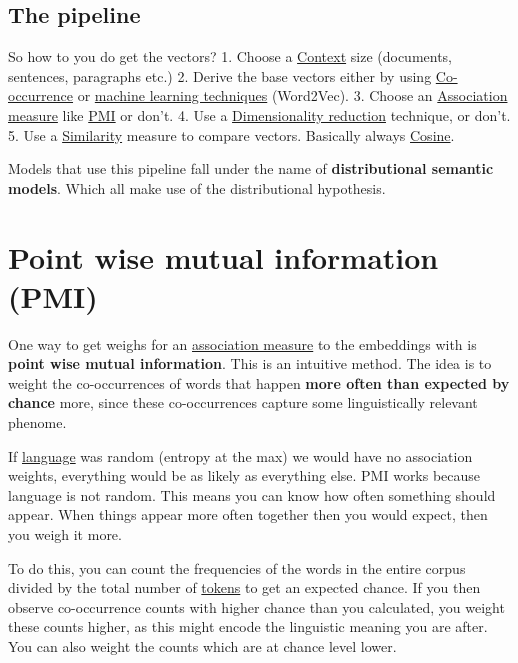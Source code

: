 \documentclass[
  11pt,
  british,
]{article}
\begin{document}
\hypertarget{the-pipeline}{%
\subsection{The pipeline}\label{the-pipeline}}

So how to you do get the vectors? 1. Choose a \href{Context.md}{Context}
size (documents, sentences, paragraphs etc.) 2. Derive the base vectors
either by using \href{Co-occurrence.md}{Co-occurrence} or
\href{../Classification/Logistic\%20Regression.md}{machine learning
techniques} (Word2Vec). 3. Choose an
\href{Association\%20measure.md}{Association measure} like
\href{Point\%20wise\%20mutual\%20information\%20(PMI).md}{PMI} or don't.
4. Use a \href{Dimensionality\%20reduction.md}{Dimensionality reduction}
technique, or don't. 5. Use a \href{Similarity.md}{Similarity} measure
to compare vectors. Basically always \href{Cosine.md}{Cosine}.

Models that use this pipeline fall under the name of
\textbf{distributional semantic models}. Which all make use of the
distributional hypothesis.

\hypertarget{point-wise-mutual-information-pmi}{%
\section{Point wise mutual information
(PMI)}\label{point-wise-mutual-information-pmi}}

One way to get weighs for an
\href{Association\%20measure.md}{association measure} to the embeddings
with is \textbf{point wise mutual information}. This is an intuitive
method. The idea is to weight the co-occurrences of words that happen
\textbf{more often than expected by chance} more, since these
co-occurrences capture some linguistically relevant phenome.

If \href{../Languages/Languages.md}{language} was random (entropy at the
max) we would have no association weights, everything would be as likely
as everything else. PMI works because language is not random. This means
you can know how often something should appear. When things appear more
often together then you would expect, then you weigh it more.

To do this, you can count the frequencies of the words in the entire
corpus divided by the total number of \href{../Data/Token.md}{tokens} to
get an expected chance. If you then observe co-occurrence counts with
higher chance than you calculated, you weight these counts higher, as
this might encode the linguistic meaning you are after. You can also
weight the counts which are at chance level lower.
\end{document}
